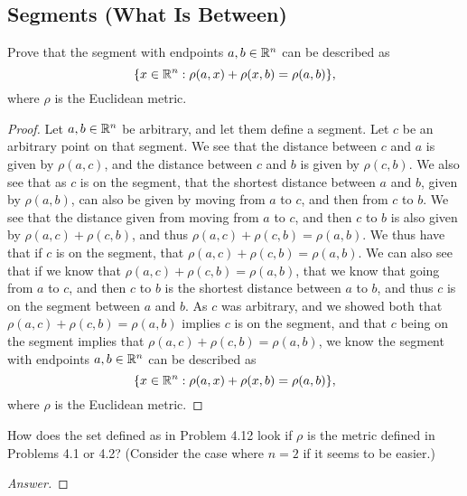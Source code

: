 \subsection{Segments (What Is Between)}

\begin{minorEx}%
    Prove that the segment with endpoints $a,b \in \mathbb{R}^n$ can be described as 
    \[
        \{x \in \mathbb{R}^n : \rho(a,x) + \rho(x,b) = \rho(a, b)\},
    \]
    where $\rho$ is the Euclidean metric.
\end{minorEx}

\begin{proof}
  Let $a,b \in \mathbb{R}^n$ be arbitrary, and let them define a segment. Let
  $c$ be an arbitrary point on that segment. We see that the distance
  between $c$ and $a$ is given by $\rho(a,c)$, and the distance
  between $c$ and $b$ is given by $\rho(c,b)$. We also see that as $c$
  is on the segment, that the shortest distance between $a$ and $b$,
  given by $\rho(a,b)$, can also be given by moving from $a$ to $c$,
  and then from $c$ to $b$. We see that the distance given from moving
  from $a$ to $c$, and then $c$ to $b$ is also given by
  $\rho(a,c)+\rho(c,b)$, and thus $\rho(a,c)+\rho(c,b)= \rho(a,b)$. We
  thus have that if $c$ is on the segment, that $\rho(a,c)+\rho(c,b)=
  \rho(a,b)$. We can also see that if we know that $\rho(a,c)+\rho(c,b)=
  \rho(a,b)$, that we know that going from $a$ to $c$, and then $c$ to
  $b$ is the shortest distance between $a$ to $b$, and thus $c$ is on
  the segment between $a$ and $b$. As $c$ was arbitrary, and we showed
  both that $\rho(a,c)+\rho(c,b)= \rho(a,b)$ implies $c$ is on the
  segment, and that $c$ being on the segment implies that
  $\rho(a,c)+\rho(c,b)= \rho(a,b)$, we know the 
  segment with endpoints $a,b \in \mathbb{R}^n$ can be described as 
    \[
        \{x \in \mathbb{R}^n : \rho(a,x) + \rho(x,b) = \rho(a, b)\},
    \]
    where $\rho$ is the Euclidean metric.
\end{proof}

\begin{minorEx}%
    How does the set defined as in Problem 4.12 look if $\rho$ is the metric
    defined in Problems 4.1 or 4.2? (Consider the case where $n = 2$ if it seems
    to be easier.)
\end{minorEx}

\begin{proof}[Answer]

\end{proof}